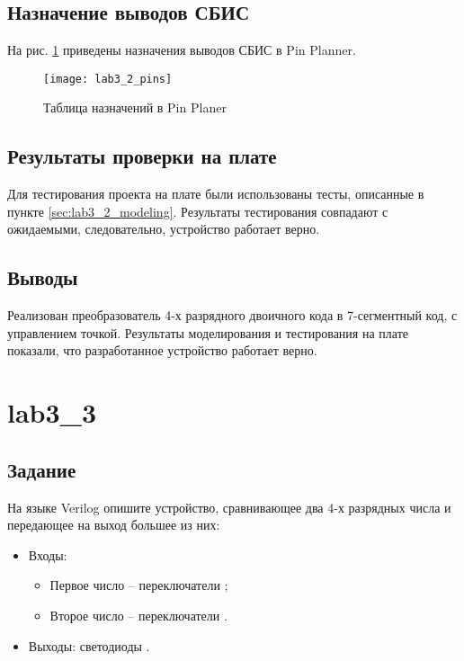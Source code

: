 \newpage

\subsection{Назначение выводов СБИС}

На рис. \ref{fig:lab3_2_pins} приведены назначения выводов СБИС в Pin Planner.

\begin{figure}[H]
\begin{center}
	\texttt{[image: lab3\_2\_pins]}
	\caption{Таблица назначений в Pin Planer}
	\label{fig:lab3_2_pins}
\end{center}
\end{figure}

\subsection{Результаты проверки на плате}

Для тестирования проекта на плате были использованы тесты, описанные в пункте \ref{sec:lab3_2_modeling}. Результаты тестирования совпадают с ожидаемыми, следовательно, устройство работает верно.

\subsection{Выводы}

Реализован преобразователь 4-х разрядного двоичного кода в 7-сегментный код, с управлением точкой. Результаты моделирования и тестирования на плате показали, что разработанное устройство работает верно.

\newpage

\section{lab3\_3}

\subsection{Задание}

На языке Verilog опишите устройство, сравнивающее два 4-х разрядных числа и передающее на выход большее из них:
\begin{itemize}
\item Входы:
	\begin{itemize}
		\item Первое число -- переключатели ;
		\item Второе число -- переключатели .
	\end{itemize}
\item Выходы: светодиоды .
\end{itemize}

